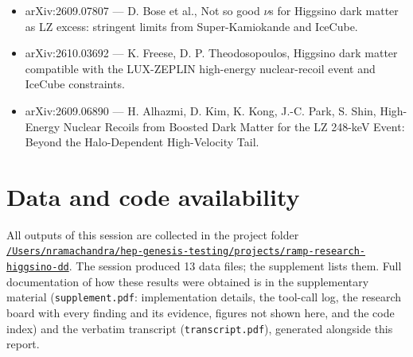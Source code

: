 \documentclass[11pt,a4paper]{article}
\begin{document}
\begin{itemize}
\item arXiv:2609.07807 --- D. Bose et al., Not so good $\nu$s for Higgsino dark matter as LZ excess: stringent limits from Super-Kamiokande and IceCube.
\item arXiv:2610.03692 --- K. Freese, D. P. Theodosopoulos, Higgsino dark matter compatible with the LUX-ZEPLIN high-energy nuclear-recoil event and IceCube constraints.
\item arXiv:2609.06890 --- H. Alhazmi, D. Kim, K. Kong, J.-C. Park, S. Shin, High-Energy Nuclear Recoils from Boosted Dark Matter for the LZ 248-keV Event: Beyond the Halo-Dependent High-Velocity Tail.
\end{itemize}

\section*{Data and code availability}
All outputs of this session are collected in the project folder \href{file:///Users/nramachandra/hep-genesis-testing/projects/ramp-research-higgsino-dd}{\texttt{/\allowbreak{}Users/\allowbreak{}nramachandra/\allowbreak{}hep-genesis-testing/\allowbreak{}projects/\allowbreak{}ramp-research-higgsino-dd}}.
The session produced 13 data files; the supplement lists them.
Full documentation of how these results were obtained is in the supplementary material (\texttt{supplement.pdf}: implementation details, the tool-call log, the research board with every finding and its evidence, figures not shown here, and the code index) and the verbatim transcript (\texttt{transcript.pdf}), generated alongside this report.
\end{document}
